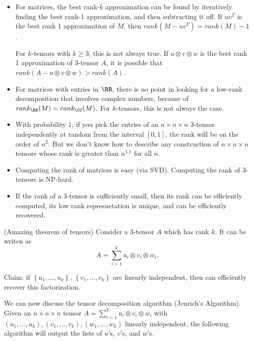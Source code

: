 \begin{itemize}
  \item For matrices, the best rank-$k$ approximation can be found by iteratively finding the best rank-1 approximation, and then subtracting it off.  If $uv^T$ is the best rank 1 approximation of $M$, then $rank(M - uv^T) = rank(M)-1$.

    For $k$-tensors with $k \geq 3$, this is not always true.  If $u \otimes v \otimes w$ is the best rank 1 approximation of 3-tensor $A$, it is possible that $rank(A - u \otimes v \otimes w) > rank(A)$.

  \item For matrices with entries in $\RR$, there is no point in looking for a low-rank decomposition that involves complex numbers, because of $rank_{\RR}(M) = rank_{\CC}(M)$.  For $k$-tensors, this is not always the case.

  \item With probability $1$, if you pick the entries of an $n \times n \times n$ 3-tensor independently at random from the interval $[0, 1]$, the rank will be on the order of $n^2$.  But we don't know how to describe any construction of $n \times n \times n$ tensors whose rank is greater than $n^{1.1}$ for all $n$.

  \item Computing the rank of matrices is easy (via SVD).  Computing the rank of 3-tensors is NP-hard.

  \item If the rank of a 3-tensor is sufficiently small, then its rank can be efficiently computed, its low rank represnetation is unique, and can be efficiently recovered.
\end{itemize}

\begin{theorem} (Amazing theorem of tensors) Consider a 3-tensor $A$ which has rank $k$.  It can be writen as
  \[
    A = \sum_{i=1}^{k} u_i \otimes v_i \otimes w_i.
  \]

  Claim: if $\left\{ u_1, \dots, u_k \right\}$, $\left\{ v_1, \dots, v_k \right\}$ are linearly independent, then can efficiently recover this factorization.
\end{theorem}

We can now discuss the tensor decomposition algorithm (Jenrich's Algorithm).  Given an $n \times n \times n$ tensor $A = \sum_{i=1}^{k} u_i \otimes v_i \otimes w_i$ with $(u_1, \dots, u_k), (v_1, \dots, v_k), (w_1, \dots, w_k)$ linearly independent, the following algorithm will output the lists of $u$'s, $v$'s, and $w$'s.

